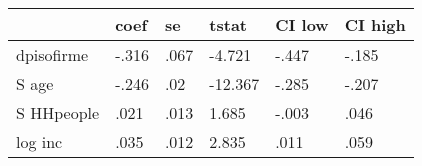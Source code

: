 \begin{table}[htbp]
\begin{tabular}{llllll} \hline \hline
 & coef  & se  & tstat  & CI low  & CI high  \\  \hline 
dpisofirme & -.316 & .067 & -4.721 & -.447 & -.185 \\  
S age & -.246 & .02 & -12.367 & -.285 & -.207 \\  
S HHpeople & .021 & .013 & 1.685 & -.003 & .046 \\  
log inc & .035 & .012 & 2.835 & .011 & .059 \\  
\hline \hline \end{tabular}
\end{table}
